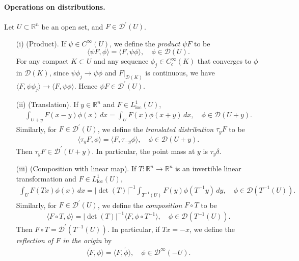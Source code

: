 \documentclass{article}
\numberwithin{equation}{section}
\newcommand{\bbR}{\mathbb{R}}
\renewcommand{\cal}{\mathcal}
\newcommand{\loc}{\mathrm{loc}}
\newcommand{\wt}{\widetilde}
\theoremstyle{plain}
\theoremstyle{definition}
\begin{document}
\paragraph{Operations on distributions.} Let $U\subset\bbR^n$ be an open set, and $F\in\cal{D}^\prime(U)$.
\begin{itemize}
\item[(i)] (Product). If $\psi\in C^\infty(U)$, we define the \textit{product} $\psi F$ to be \vspace{-0.05cm} $$\langle\psi F,\phi\rangle=\langle F,\psi\phi\rangle,\quad\phi\in \cal{D}(U).$$
For any compact $K\subset U$ and any sequence $\phi_j\in C_c^\infty(K)$ that converges to $\phi$ in $\cal{D}(K)$, since $\psi\phi_j\to\psi\phi$ and $F|_{\cal{D}(K)}$ is continuous, we have $\langle F,\psi\phi_j\rangle\to\langle F,\psi\phi\rangle$. Hence $\psi F\in\cal{D}^\prime(U)$.

\item[(ii)] (Translation). If $y\in\bbR^n$ and $F\in L^1_\loc(U)$,\vspace{-0.05cm}
\begin{align*}
	\int_{U+y} F(x-y)\phi(x)\,dx=\int_U F(x)\phi(x+y)\,dx,\quad\phi\in\cal{D}(U+y).
\end{align*}
Similarly, for $F\in\cal{D}^\prime(U)$, we define the \textit{translated distribution} $\tau_y F$ to be \vspace{-0.05cm} 
\begin{align*}
	\langle\tau_y F,\phi\rangle=\langle F,\tau_{-y}\phi\rangle,\quad\phi\in \cal{D}(U+y).
\end{align*}
Then $\tau_y F\in\cal{D}^\prime(U+y)$. In particular, the point mass at $y$ is $\tau_y\delta$. 

\item[(iii)] (Composition with linear map). If $T:\bbR^n\to\bbR^n$ is an invertible linear transformation and $F\in L^1_\loc(U)$,
\begin{align*}
    \int_U F(Tx)\phi(x)\,dx=\left\vert\det(T)\right\vert^{-1}\int_{T^{-1}(U)} F(y)\phi(T^{-1}y)\,dy,\quad \phi\in\cal{D}(T^{-1}(U)).
\end{align*}  
Similarly, for $F\in\cal{D}^\prime(U)$, we define the \textit{composition} $F\circ T$ to be
\begin{align*}
	\langle F\circ T,\phi\rangle=\left\vert\det(T)\right\vert^{-1}\langle F,\phi\circ T^{-1}\rangle,\quad \phi\in\cal{D}(T^{-1}(U)).
\end{align*}
Then $F\circ T=\cal{D}^\prime(T^{-1}(U))$. In particular, if $Tx=-x$, we define the \textit{reflection of $F$ in the origin} by
\begin{align*}
    \langle\wt{F},\phi\rangle=\langle F,\wt{\phi}\rangle,\quad \phi\in \cal{D}^\infty(-U).
\end{align*}


\end{itemize}
\end{document}
